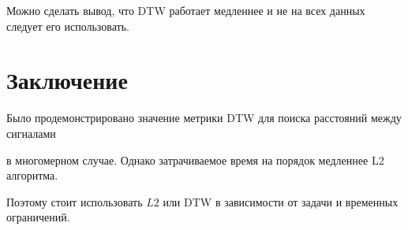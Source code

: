 \documentclass[12pt, twoside]{article}
\begin{document}
Можно сделать вывод, что DTW работает медленнее и не на всех данных следует его использовать.

\section{Заключение}

Было продемонстрировано значение метрики DTW для поиска расстояний между сигналами

в многомерном случае. Однако затрачиваемое время на порядок медленнее L2 алгоритма.

Поэтому стоит использовать $L2$ или DTW в зависимости от задачи и временных ограничений.


\nocite{*}
 


\end{document}
